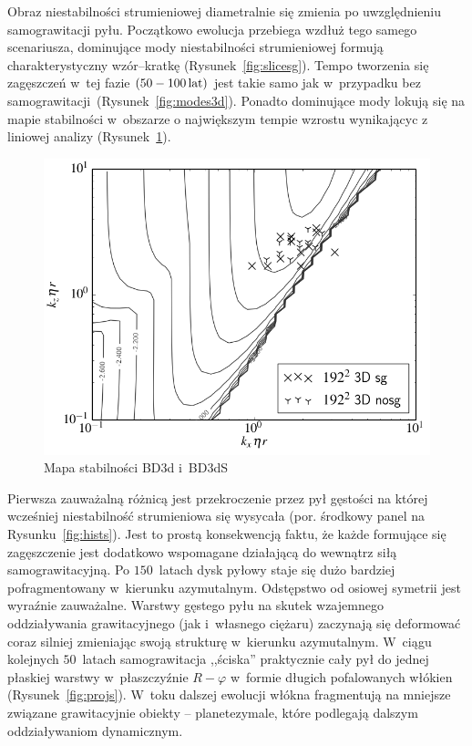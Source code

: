 %
\par Obraz niestabilności strumieniowej diametralnie się zmienia po
uwzględnieniu samograwitacji pyłu. Początkowo ewolucja przebiega wzdłuż tego
samego scenariusza, dominujące mody niestabilności strumieniowej formują
charakterystyczny wzór--kratkę (Rysunek~\ref{fig:slicesg}). Tempo tworzenia się
zagęszczeń w~tej fazie $(50 - 100\hbox{$\thinspace\textrm{lat}$})$ jest takie samo jak w~przypadku bez
samograwitacji~(Rysunek~\ref{fig:modes3d}). Ponadto dominujące mody lokują się
na mapie stabilności w~obszarze o największym tempie wzrostu wynikającyc z
liniowej analizy (Rysunek~\ref{fig:map3d}).
%
\begin{figure}[h]
   \centering
   \includegraphics[width=0.5\linewidth]{figures/3d_map_x3_50.png}
   \caption{Mapa stabilności BD3d i~BD3dS}
   \label{fig:map3d}
\end{figure}
Pierwsza zauważalną różnicą jest
przekroczenie przez pył gęstości na której wcześniej niestabilność strumieniowa
się wysycała (por. środkowy panel na Rysunku~\ref{fig:hists}). Jest to prostą
konsekwencją faktu, że każde formujące się zagęszczenie jest dodatkowo
wspomagane działającą do wewnątrz siłą samograwitacyjną. Po $150$~latach dysk
pyłowy staje się dużo bardziej pofragmentowany w~kierunku azymutalnym.
Odstępstwo od osiowej symetrii jest wyraźnie zauważalne. Warstwy gęstego pyłu na
skutek wzajemnego oddziaływania grawitacyjnego (jak i~własnego ciężaru)
zaczynają się deformować coraz silniej zmieniając swoją strukturę w~kierunku
azymutalnym. W~ciągu kolejnych $50$~latach samograwitacja ,,ściska'' praktycznie
cały pył do jednej płaskiej warstwy w~płaszczyźnie $R - \varphi$ w~formie
długich pofalowanych włókien (Rysunek~\ref{fig:projs}). W~toku dalszej ewolucji
włókna fragmentują na mniejsze związane grawitacyjnie obiekty -- planetezymale,
które podlegają dalszym oddziaływaniom dynamicznym. 

